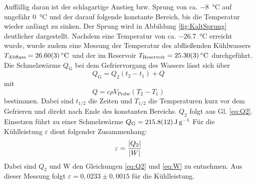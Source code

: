 	Auffällig daran ist der schlagartige Anstieg bzw. Sprung von ca. \SI{-8}{\celsius} auf ungefähr \SI{0}{\celsius} und der darauf folgende konstante Bereich, bis die Temperatur wieder anfängt zu sinken.
	Der Sprung wird in Abbildung \ref{fig:KaltSprung} deutlicher dargestellt.
	Nachdem eine Temperatur  von ca. \SI{-26,7}{\celsius} erreicht wurde, wurde zudem eine Messung der Temperatur des abfließenden Kühlwassers $T_\text{Abfluss} = \SI{26,6+-0,03}{\celsius}$ und der im Reservoir $T_\text{Reservoir} = \SI{25,3+-0,03}{\celsius}$ durchgeführt.
	Die Schmelzwärme $Q_\text{G}$ bei dem Gefriervorgang des Wassers lässt sich über 
	\begin{equation} %
		Q_\text{G} = Q_2 (t_2 - t_1) + Q
	\end{equation} %
	mit
	\begin{equation} \label{eq:Q} %
		Q = c \rho V_\text{Probe} (T_2 - T_1)
	\end{equation} %
	bestimmen.
	Dabei sind $t_{1/2}$ die Zeiten und $T_{1/2}$ die Temperaturen kurz vor dem Gefrieren und direkt nach Ende des konstanten Bereichs.
	$Q_2$ folgt aus Gl. \ref{eq:Q2}.
	Einsetzen führt zu einer Schmelzwärme $Q_\text{G} = \SI{215.8+-1.2}{\joule\per\gram}$ 
	Für die Kühlleistung $\varepsilon$ dient folgender Zusammenhang:
	\begin{equation} \label{eq:eps} %
		\varepsilon = \frac{\abs{Q_2}}{\abs{W}}
	\end{equation} %
	Dabei sind $Q_2$ und W den Gleichungen \ref{eq:Q2} und \ref{eq:W} zu entnehmen.
	Aus dieser Messung folgt $\varepsilon = 0,0233\pm 0,0015$ für die Kühlleistung.
	

